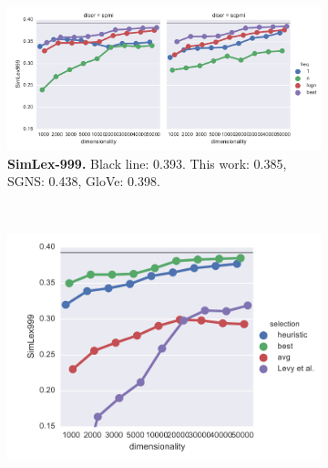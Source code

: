 \begin{figure}
  \centering
  \begin{subfigure}[t]{0.6\textwidth}
    \includegraphics[width=\textwidth]{supplement/figures/SimLex999-best}
    \caption{\scriptsize \textbf{SimLex-999.} Black line: 0.393.
      This work: 0.385,
      SGNS: 0.438,
      GloVe: 0.398.
    }
    \label{fig:best-simlex}
  \end{subfigure}
  ~
  \begin{subfigure}[t]{0.37\textwidth}
    \includegraphics[width=\textwidth]{supplement/figures/SimLex999-global-best}
    \caption{}
    \label{fig:global-best-simlex}
  \end{subfigure}


\end{figure}
